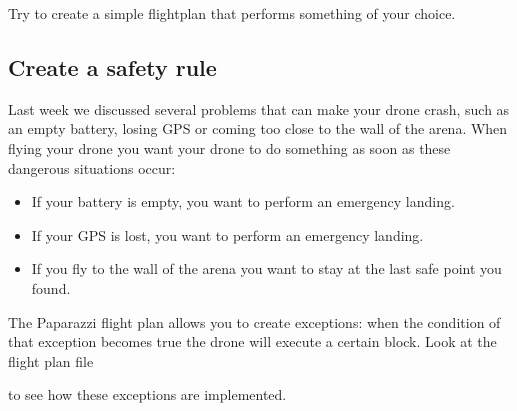 Try to create a simple flightplan that performs something of your choice. 

\subsection*{Create a safety rule}
Last week we discussed several problems that can make your drone crash, such as an empty battery, losing GPS or coming too close to the wall of the arena.
When flying your drone you want your drone to do something as soon as these dangerous situations occur:
\begin{itemize}
	\item If your battery is empty, you want to perform an emergency landing.
	\item If your GPS is lost, you want to perform an emergency landing.
	\item If you fly to the wall of the arena you want to stay at the last safe point you found. 
\end{itemize}
The Paparazzi flight plan allows you to create exceptions: when the condition of that exception becomes true the drone will execute a certain block. Look at the flight plan file 

 to see how these exceptions are implemented. 
